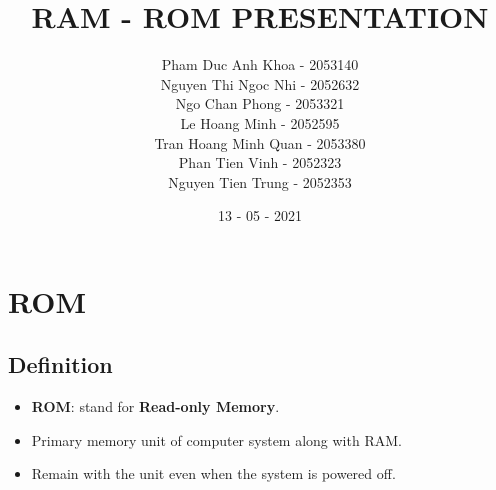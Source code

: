 \documentclass [12pt]{article}
\title {\textbf{RAM - ROM PRESENTATION}}
\author{Pham Duc Anh Khoa - 2053140 \\
				Nguyen Thi Ngoc Nhi - 2052632\\
				Ngo Chan Phong - 2053321 \\
				Le Hoang Minh - 2052595 \\
				Tran Hoang Minh Quan - 2053380 \\
				Phan Tien Vinh - 2052323\\
				Nguyen Tien Trung - 2052353}
\date{13 - 05 - 2021}
\begin{document}
	\maketitle 
	\newpage

	\section {ROM}
		\subsection {Definition}
				\begin{itemize}
					\item \textbf{ROM}: stand for \textbf{Read-only Memory}.
					\item Primary memory unit of computer system along with RAM.
					\item Remain with the unit even when the system is powered off.
					\end{itemize}
\end{document}
